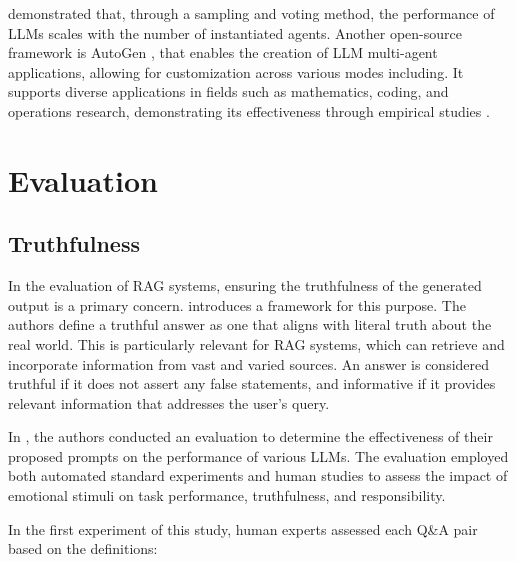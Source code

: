             \citet{Li2024} demonstrated that, through a sampling and voting method, the performance of LLMs scales with the number of instantiated agents.
            Another open-source framework is AutoGen \citep{Wu2023}, that enables the creation of LLM multi-agent applications, allowing for customization across various modes including. It supports diverse applications in fields such as mathematics, coding, and operations research, demonstrating its effectiveness through empirical studies \citep{Wu2023}.

            
        \section{Evaluation}

            \subsection{Truthfulness}

                In the evaluation of RAG systems, ensuring the truthfulness of the generated output is a primary concern. \citet{Lin2022} introduces a framework for this purpose. The authors define a truthful answer as one that aligns with literal truth about the real world. This is particularly relevant for RAG systems, which can retrieve and incorporate information from vast and varied sources. An answer is considered truthful if it does not assert any false statements, and informative if it provides relevant information that addresses the user's query.
                
                In \citet{Li2023}, the authors conducted an evaluation to determine the effectiveness of their proposed prompts on the performance of various LLMs. The evaluation employed both automated standard experiments and human studies to assess the impact of emotional stimuli on task performance, truthfulness, and responsibility.

                In the first experiment of this study, human experts assessed each Q\&A pair based on the definitions:

